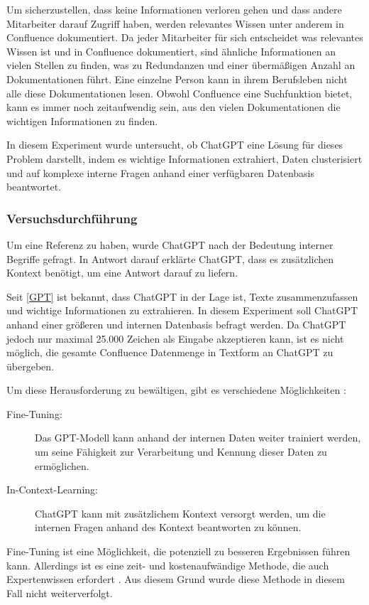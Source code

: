 Um sicherzustellen, dass keine Informationen verloren gehen und dass andere Mitarbeiter darauf Zugriff haben, werden relevantes Wissen unter anderem in Confluence dokumentiert. Da jeder Mitarbeiter für sich entscheidet was relevantes Wissen ist und in Confluence dokumentiert, sind ähnliche Informationen an vielen Stellen zu finden, was zu Redundanzen und einer übermäßigen Anzahl an Dokumentationen führt. Eine einzelne Person kann in ihrem Berufsleben nicht alle diese Dokumentationen lesen. Obwohl Confluence eine Suchfunktion bietet, kann es immer noch zeitaufwendig sein, aus den vielen Dokumentationen die wichtigen Informationen zu finden.

In diesem Experiment wurde untersucht, ob ChatGPT eine Lösung für dieses Problem darstellt, indem es wichtige Informationen extrahiert, Daten clusterisiert und auf komplexe interne Fragen anhand einer verfügbaren Datenbasis beantwortet.

\subsubsection{Versuchsdurchführung}
Um eine Referenz zu haben, wurde ChatGPT nach der Bedeutung interner Begriffe gefragt. In Antwort darauf erklärte ChatGPT, dass es zusätzlichen Kontext benötigt, um eine Antwort darauf zu liefern.

Seit \autoref{GPT} ist bekannt, dass ChatGPT in der Lage ist, Texte zusammenzufassen und wichtige Informationen zu extrahieren. In diesem Experiment soll ChatGPT anhand einer größeren und internen Datenbasis befragt werden. Da ChatGPT jedoch nur maximal 25.000 Zeichen als Eingabe akzeptieren kann, ist es nicht möglich, die gesamte Confluence Datenmenge in Textform an ChatGPT zu übergeben.

Um diese Herausforderung zu bewältigen, gibt es verschiedene Möglichkeiten \cite{doc:chatgptinternal}:

\begin{description}
\item [Fine-Tuning:] Das GPT-Modell kann anhand der internen Daten weiter trainiert werden, um seine Fähigkeit zur Verarbeitung und Kennung dieser Daten zu ermöglichen.
\item [In-Context-Learning:] ChatGPT kann mit zusätzlichem Kontext versorgt werden, um die internen Fragen anhand des Kontext beantworten zu können.
\end{description}

Fine-Tuning ist eine Möglichkeit, die potenziell zu besseren Ergebnissen führen kann. Allerdings ist es eine zeit- und kostenaufwändige Methode, die auch Expertenwissen erfordert \cite{doc:OpenAI-price}. Aus diesem Grund wurde diese Methode in diesem Fall nicht weiterverfolgt.

